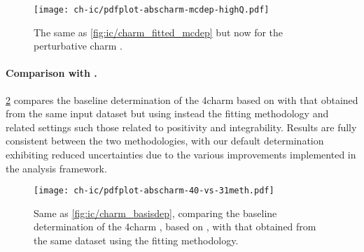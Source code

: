 \begin{figure}[t]
  \begin{center}
    \texttt{[image: ch-ic/pdfplot-abscharm-mcdep-highQ.pdf]}
    \caption{\small The same as \cref{fig:ic/charm_fitted_mcdep} but now
    for the perturbative charm \pdf.
  \label{fig:ic/charm_pert_mcdep} }
\end{center}
\end{figure}



  \paragraph{Comparison with .}
  \cref{fig:ic/pdfplot-abscharm-40-vs-31meth} compares
  the baseline determination of the 4\fns charm \pdf based
  on  with that obtained
  from the same input dataset but using instead
  the  fitting methodology and related settings such those related to positivity
  and integrability.
  Results are fully consistent between the two methodologies, with our default
  determination exhibiting reduced uncertainties due to
  the various improvements implemented
  in the  analysis framework.
  
\begin{figure}[t]
  \begin{center}
    \texttt{[image: ch-ic/pdfplot-abscharm-40-vs-31meth.pdf]}
    \caption{\small Same as \cref{fig:ic/charm_basisdep}, comparing
      the baseline determination of the 4\fns charm \pdf, based
      on , with that obtained
      from the same dataset using the  fitting methodology.
  \label{fig:ic/pdfplot-abscharm-40-vs-31meth} }
\end{center}
\end{figure}

